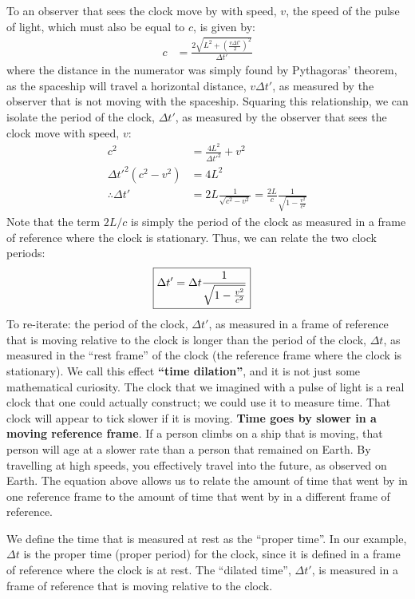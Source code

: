 To an observer that sees the clock move by with speed, $v$, the speed of the pulse of light, which must also be equal to $c$, is given by:
\begin{align*}
c&=\frac{2\sqrt{L^2+\left(\frac{v\Delta t'}{2}\right)^2}}{\Delta t'}
\end{align*}
where the distance in the numerator was simply found by Pythagoras' theorem, as the spaceship will travel a horizontal distance, $v\Delta t'$, as measured by the observer that is not moving with the spaceship. Squaring this relationship, we can isolate the period of the clock, $\Delta t'$, as measured by the observer that sees the clock move with speed, $v$:
\begin{align*}
c^2&=\frac{4L^2}{\Delta t'^2}+v^2\\
\Delta t'^2 (c^2-v^2)&=4L^2\\
\therefore \Delta t' &= 2L\frac{1}{\sqrt{c^2-v^2}}=\frac{2L}{c}\frac{1}{\sqrt{1-\frac{v^2}{c^2}}}
\end{align*}
Note that the term $2L/c$ is simply the period of the clock as measured in a frame of reference where the clock is stationary. Thus, we can relate the two clock periods:
\begin{align*}
\Aboxed{\Delta t' &= \Delta t \frac{1}{\sqrt{1-\frac{v^2}{c^2}}}}
\end{align*}
To re-iterate: the period of the clock, $\Delta t'$, as measured in a frame of reference that is moving relative to the clock is longer than the period of the clock, $\Delta t$, as measured in the ``rest frame'' of the clock (the reference frame where the clock is stationary). We call this effect \textbf{``time dilation''}, and it is not just some mathematical curiosity. The clock that we imagined with a pulse of light is a real clock that one could actually construct; we could use it to measure time. That clock will appear to tick slower if it is moving. \textbf{Time goes by slower in a moving reference frame}. If a person climbs on a ship that is moving, that person will age at a slower rate than a person that remained on Earth. By travelling at high speeds, you effectively travel into the future, as observed on Earth. The equation above allows us to relate the amount of time that went by in one reference frame to the amount of time that went by in a different frame of reference.

We define the time that is measured at rest as the ``proper time''. In our example, $\Delta t$ is the proper time (proper period) for the clock, since it is defined in a frame of reference where the clock is at rest. The ``dilated time'', $\Delta t'$, is measured in a frame of reference that is moving relative to the clock.


